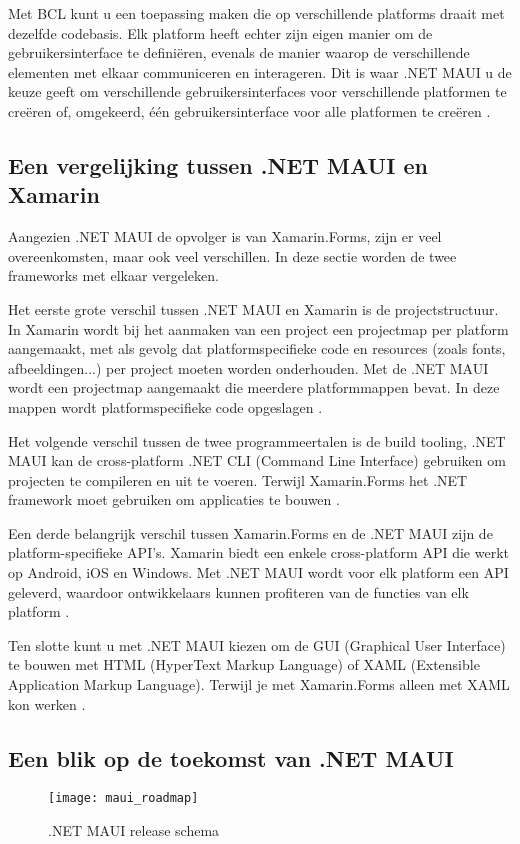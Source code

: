 Met BCL kunt u een toepassing maken die op verschillende platforms draait met dezelfde codebasis. Elk platform heeft echter zijn eigen manier om de gebruikersinterface te definiëren, evenals de manier waarop de verschillende elementen met elkaar communiceren en interageren. Dit is waar .NET MAUI u de keuze geeft om verschillende gebruikersinterfaces voor verschillende platformen te creëren of, omgekeerd, één gebruikersinterface voor alle platformen te creëren \autocite{Britch2023}.

\subsection{Een vergelijking tussen .NET MAUI en Xamarin}
Aangezien .NET MAUI de opvolger is van Xamarin.Forms, zijn er veel overeenkomsten, maar ook veel verschillen. In deze sectie worden de twee frameworks met elkaar vergeleken.

Het eerste grote verschil tussen .NET MAUI en Xamarin is de projectstructuur. In Xamarin wordt bij het aanmaken van een project een projectmap per platform aangemaakt, met als gevolg dat platformspecifieke code en resources (zoals fonts, afbeeldingen...) per project moeten worden onderhouden. Met de .NET MAUI wordt een projectmap aangemaakt die meerdere platformmappen bevat. In deze mappen wordt platformspecifieke code opgeslagen \autocite{Koleva2023}.

Het volgende verschil tussen de twee programmeertalen is de build tooling, .NET MAUI kan de cross-platform .NET CLI (Command Line Interface) gebruiken om projecten te compileren en uit te voeren. Terwijl Xamarin.Forms het .NET framework moet gebruiken om applicaties te bouwen \autocite{Kathiresan2022}.

Een derde belangrijk verschil tussen Xamarin.Forms en de .NET MAUI zijn de platform-specifieke API's. Xamarin biedt een enkele cross-platform API die werkt op Android, iOS en Windows. Met .NET MAUI wordt voor elk platform een API geleverd, waardoor ontwikkelaars kunnen profiteren van de functies van elk platform \autocite{UXDivers}.

Ten slotte kunt u met .NET MAUI kiezen om de GUI (Graphical User Interface) te bouwen met HTML (HyperText Markup Language) of XAML (Extensible Application Markup Language). Terwijl je met Xamarin.Forms alleen met XAML kon werken \autocite{Kathiresan2022}.

\subsection{Een blik op de toekomst van .NET MAUI}
\begin{figure}[H]
    \texttt{[image: maui\_roadmap]}
    \centering
    \caption{.NET MAUI release schema}
    \label{fig:mauiRoadMap}
\end{figure}

